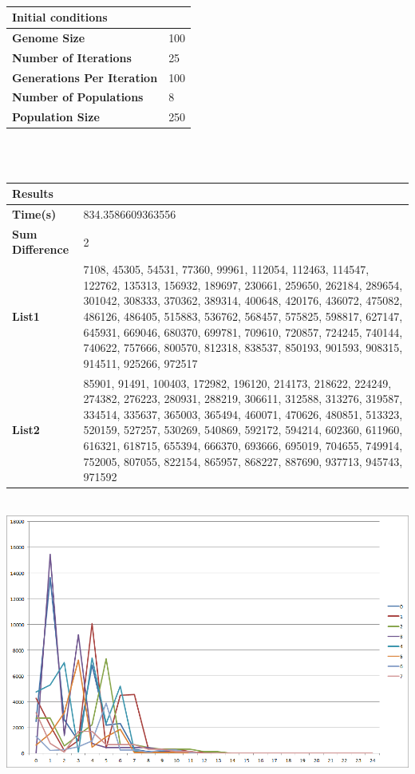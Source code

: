 \documentclass{article}
\begin{document}
\\

\begin{tabulary}{\textwidth}{l L}
\hline
\bf{Initial conditions}&\\
\hline
\bf{Genome Size} & 100\\
\bf{Number of Iterations} & 25\\
\bf{Generations Per Iteration} & 100\\
\bf{Number of Populations} & 8\\
\bf{Population Size} & 250\\
\hline
\end{tabulary}\\\\

\begin{tabulary}{\textwidth}{l L}
\hline
\bf{Results}&\\
\hline
\bf{Time(s)} & 834.3586609363556\\
\bf{Sum Difference} & 2\\
\bf{List1} & 7108, 45305, 54531, 77360, 99961, 112054, 112463, 114547, 122762, 135313, 156932, 189697, 230661, 259650, 262184, 289654, 301042, 308333, 370362, 389314, 400648, 420176, 436072, 475082, 486126, 486405, 515883, 536762, 568457, 575825, 598817, 627147, 645931, 669046, 680370, 699781, 709610, 720857, 724245, 740144, 740622, 757666, 800570, 812318, 838537, 850193, 901593, 908315, 914511, 925266, 972517\\
\bf{List2} & 85901, 91491, 100403, 172982, 196120, 214173, 218622, 224249, 274382, 276223, 280931, 288219, 306611, 312588, 313276, 319587, 334514, 335637, 365003, 365494, 460071, 470626, 480851, 513323, 520159, 527257, 530269, 540869, 592172, 594214, 602360, 611960, 616321, 618715, 655394, 666370, 693666, 695019, 704655, 749914, 752005, 807055, 822154, 865957, 868227, 887690, 937713, 945743, 971592\\
\hline
\end{tabulary}

\newpage
{}\\
\includegraphics[width=210mm, angle=270]{results.png}
\end{document}
